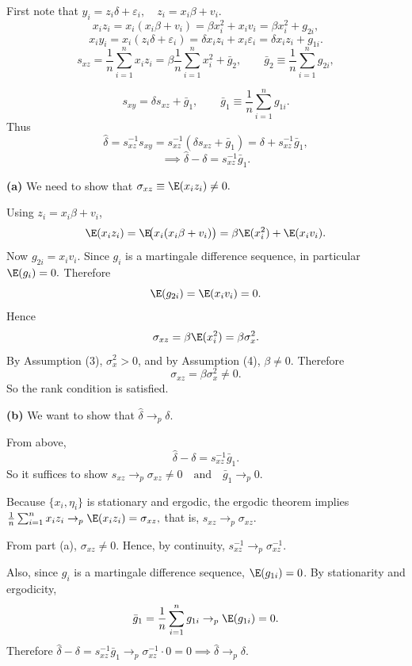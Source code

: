 \documentclass[12pt, letterpaper, onecolumn]{exam}
\begin{document}
\begin{solution}
    First note that
    $y_i=z_i\delta+\varepsilon_i, \quad z_i=x_i\beta+v_i.$
    $$x_i z_i = x_i(x_i\beta+v_i)=\beta x_i^2 + x_i v_i = \beta x_i^2 + g_{2i},$$
    $$x_i y_i = x_i(z_i\delta+\varepsilon_i)=\delta x_i z_i + x_i\varepsilon_i= \delta x_i z_i + g_{1i}.$$
    $$
        s_{xz}=\frac1n\sum_{i=1}^n x_i z_i=
        \beta\frac1n\sum_{i=1}^n x_i^2+\bar g_2,
        \qquad \bar g_2\equiv \frac1n\sum_{i=1}^n g_{2i},
    $$

    $$
        s_{xy}=
        \delta s_{xz}+\bar g_1,
        \qquad
        \bar g_1\equiv \frac1n\sum_{i=1}^n g_{1i}.
    $$
    Thus
    $$
        \hat\delta=s_{xz}^{-1}s_{xy}
        =
        s_{xz}^{-1}(\delta s_{xz}+\bar g_1)
        =
        \delta+s_{xz}^{-1}\bar g_1,
    $$
    $$
        \implies
        \hat\delta-\delta=s_{xz}^{-1}\bar g_1.
    $$

    \textbf{(a)} We need to show that $\sigma_{xz}\equiv \E(x_i z_i)\neq 0.$

    Using \(z_i=x_i\beta+v_i\),
    $$
        \E(x_i z_i)=\E\!\bigl(x_i(x_i\beta+v_i)\bigr)
        =
        \beta \E(x_i^2)+\E(x_i v_i).
    $$
    Now $g_{2i}=x_i v_i.$
    Since \(g_i\) is a martingale difference sequence, in particular $\E(g_i)=0.$
    Therefore
    $$
        \E(g_{2i})=\E(x_i v_i)=0.
    $$
    Hence
    $$
        \sigma_{xz}
        =
        \beta \E(x_i^2)
        =
        \beta \sigma_x^2.
    $$
    By Assumption (3), \(\sigma_x^2>0\), and by Assumption (4), \(\beta\neq 0\). Therefore
    $$
        \sigma_{xz}=\beta \sigma_x^2\neq 0.
    $$
    So the rank condition is satisfied.

    \textbf{(b)} We want to show that $\hat\delta\to_p \delta.$

    From above,
    $$
        \hat\delta-\delta=s_{xz}^{-1}\bar g_1.
    $$
    So it suffices to show
    $s_{xz}\to_p \sigma_{xz}\neq 0 \quad\text{and} \quad \bar g_1\to_p 0.$

    Because \(\{x_i,\eta_i\}\) is stationary and ergodic, the ergodic theorem implies $\frac1n\sum_{i=1}^n x_i z_i \to_p \E(x_i z_i)=\sigma_{xz},$ that is, $s_{xz}\to_p \sigma_{xz}.$

    From part (a), \(\sigma_{xz}\neq 0\). Hence, by continuity, $s_{xz}^{-1}\to_p \sigma_{xz}^{-1}.$

    Also, since \(g_i\) is a martingale difference sequence, \(\E(g_{1i})=0\). By stationarity and ergodicity,
    $$
        \bar g_1=\frac1n\sum_{i=1}^n g_{1i}\to_p \E(g_{1i})=0.
    $$
    Therefore $\hat\delta-\delta=s_{xz}^{-1}\bar g_1 \to_p \sigma_{xz}^{-1}\cdot 0=0 \implies \hat\delta\to_p \delta.$


\end{solution}
\end{document}
